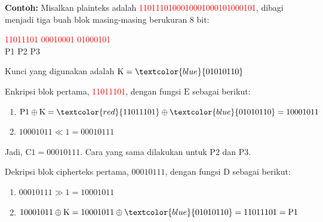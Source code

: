 \documentclass{article}
\begin{document}

\textbf{Contoh:} Misalkan plainteks adalah \textcolor{red}{1101110100010001000101000101}, dibagi menjadi tiga buah blok masing-masing berukuran 8 bit:

\begin{center}
\textcolor{red}{11011101} \quad \textcolor{red}{00010001} \quad \textcolor{red}{01000101} \\
P1 \qquad\qquad P2 \qquad\qquad P3
\end{center}

\vspace{5mm}

Kunci yang digunakan adalah $\text{K} = \textcolor{blue}{01010110}$

Enkripsi blok pertama, \textcolor{red}{11011101}, dengan fungsi $\text{E}$ sebagai berikut:
\begin{enumerate}
  \item $\text{P1} \oplus \text{K} = \textcolor{red}{11011101} \oplus \textcolor{blue}{01010110} = 10001011$
  \item $10001011 \ll 1 = 00010111$
\end{enumerate}

Jadi, $\text{C1} = 00010111$. Cara yang sama dilakukan untuk $\text{P2}$ dan $\text{P3}$.

Dekripsi blok cipherteks pertama, $00010111$, dengan fungsi $\text{D}$ sebagai berikut:
\begin{enumerate}
  \item $00010111 \gg 1 = 10001011$
  \item $10001011 \oplus \text{K} = 10001011 \oplus \textcolor{blue}{01010110} = 11011101 = \text{P1}$
\end{enumerate}
\end{document}
